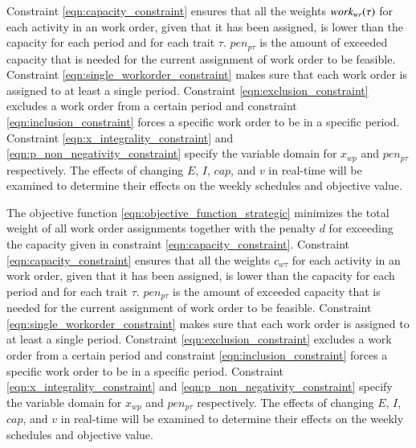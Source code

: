 Constraint \eqref{eqn:capacity_constraint}
ensures that all the weights $work_{wr}(\tau)$ for each activity in an work
order, given that it has been assigned, is lower than the capacity for each
period and for each trait $\tau$. $pen_{p\tau}$ is the amount of exceeded
capacity that is needed for the current assignment of work order to be
feasible. Constraint \eqref{eqn:single_workorder_constraint} makes sure
that each work order is assigned to at least a single period. Constraint
\eqref{eqn:exclusion_constraint} excludes a work order from a certain period
and constraint \eqref{eqn:inclusion_constraint} forces a specific work order
to be in a specific period. Constraint \eqref{eqn:x_integrality_constraint} and
\eqref{eqn:p_non_negativity_constraint} specify the variable domain for $x_{wp}$
and $pen_{p\tau}$ respectively. The effects of changing $E$, $I$, $cap$, and $v$
in real-time will be examined to determine their effects on the weekly schedules
and objective value.

The objective function \eqref{eqn:objective_function_strategic} minimizes the total weight of all work order assignments together with the penalty $d$ for exceeding the capacity given in constraint \eqref{eqn:capacity_constraint}. Constraint \eqref{eqn:capacity_constraint} ensures that all the weights $c_{w\tau}$ for each activity in an work order, given that it has been assigned, is lower than the capacity for each period and for each trait $\tau$. $pen_{p\tau}$ is the amount of exceeded capacity that is needed for the current assignment of work order to be feasible. Constraint \eqref{eqn:single_workorder_constraint} makes sure that each work order is assigned to at least a single period. Constraint \eqref{eqn:exclusion_constraint} excludes a work order from a certain period and constraint \eqref{eqn:inclusion_constraint} forces a specific work order to be in a specific period. Constraint \eqref{eqn:x_integrality_constraint} and \eqref{eqn:p_non_negativity_constraint} specify the variable domain for $x_{wp}$ and $pen_{p\tau}$ respectively. The effects of changing $E$, $I$, $cap$, and $v$ in real-time will be examined to determine their effects on the weekly schedules and objective value.
